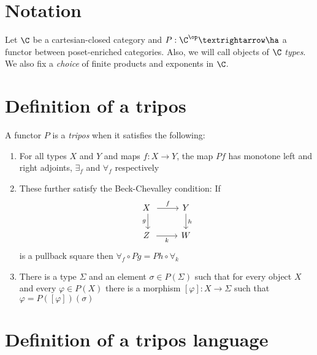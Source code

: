 \section{Notation}
Let \(\C\) be a cartesian-closed category and \(P : \C^\op → \ha\) a functor between poset-enriched categories.
Also, we will call objects of \(\C\) \emph{types}.
We also fix a \emph{choice} of finite products and exponents in \(\C\).

\section{Definition of a tripos}

\begin{definition}[Tripos]
    A functor \(P\) is a \emph{tripos} when it satisfies the following:
    \begin{enumerate}
        \item For all types \(X\) and \(Y\) and maps \(f : X → Y\), the map \(Pf\) has monotone left and right adjoints, \(∃_f\) and \(∀_f\) respectively
        \item These further satisfy the Beck-Chevalley condition:
        If %
        \[\begin{tikzcd}
            X \ & Y \\
            Z \ & W
            \arrow["f", from=1-1, to=1-2]
            \arrow["g"', from=1-1, to=2-1]
            \arrow["h", from=1-2, to=2-2]
            \arrow["k"', from=2-1, to=2-2]
        \end{tikzcd}\]
        is a pullback square then \(∀_f ∘Pg = Ph ∘∀_k\)
        \item There is a type \(\Sigma\) and an element \(\sigma ∈ P(\Sigma)\) such that for every object \(X\) and every \(φ ∈ P(X)\) there is a morphism \([φ] : X → \Sigma\) such that \(φ = P([φ])(\sigma)\)
    \end{enumerate}
\end{definition}

\section{Definition of a tripos language}

